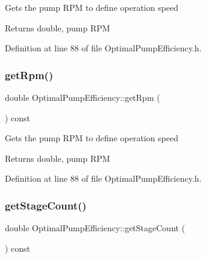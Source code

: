 Gets the pump R\+PM to define operation speed

\begin{DoxyReturn}{Returns}
double, pump R\+PM 
\end{DoxyReturn}


Definition at line 88 of file Optimal\+Pump\+Efficiency.\+h.

\mbox{\label{class_optimal_pump_efficiency_a58e8a430ced612e0518abd07fb30b085}} 
\subsubsection{\texorpdfstring{get\+Rpm()}{getRpm()}\hspace{0.1cm}{\footnotesize\ttfamily [3/3]}}
{\footnotesize\ttfamily double Optimal\+Pump\+Efficiency\+::get\+Rpm (\begin{DoxyParamCaption}{ }\end{DoxyParamCaption}) const\hspace{0.3cm}{\ttfamily [inline]}}

Gets the pump R\+PM to define operation speed

\begin{DoxyReturn}{Returns}
double, pump R\+PM 
\end{DoxyReturn}


Definition at line 88 of file Optimal\+Pump\+Efficiency.\+h.

\mbox{\label{class_optimal_pump_efficiency_aac0c1a4a6492bf00b245c2a61d100eaa}} 
\subsubsection{\texorpdfstring{get\+Stage\+Count()}{getStageCount()}\hspace{0.1cm}{\footnotesize\ttfamily [1/3]}}
{\footnotesize\ttfamily double Optimal\+Pump\+Efficiency\+::get\+Stage\+Count (\begin{DoxyParamCaption}{ }\end{DoxyParamCaption}) const\hspace{0.3cm}{\ttfamily [inline]}}

